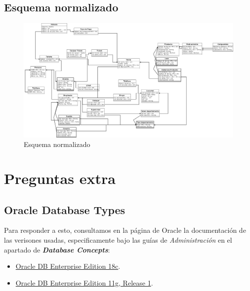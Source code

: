 \documentclass[10pt]{article}
\begin{document}
	\subsection{Esquema normalizado}
	\begin{figure}[H]
		\centering
		\includegraphics[scale=0.2]{practica07Norm.jpeg}
		\caption{Esquema normalizado}
		\label{fg:en}
	\end{figure}
	
	\section*{Preguntas extra}
	
	\subsection{Oracle Database Types}
	Para  responder a esto, consultamos en la página de Oracle la documentación
	de las verisones usadas, especificamente bajo las guías de \textit{Administración}
	en el apartado de \textit{\textbf{Database Concepts}}:
	    \begin{itemize}
	        \item \href{https://docs.oracle.com/en/database/oracle/oracle-database/18/
	        cncpt/database-concepts.pdf}{Oracle DB Enterprise Edition 18c}.
	        \item \href{https://docs.oracle.com/cd/B28359_01/server.111/b28318/datatype
	        .htm#CNCPT413}{Oracle DB Enterprise Edition 11g, Release 1}.
	    \end{itemize}
\end{document}
